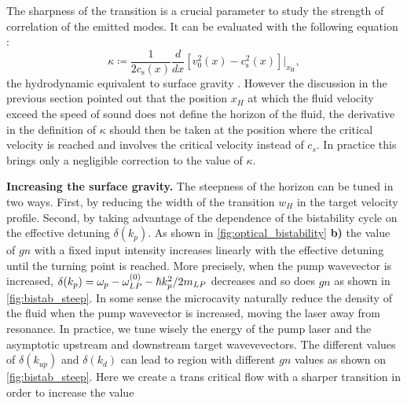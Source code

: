 The sharpness of the transition is a crucial parameter to study the strength of correlation of the emitted modes. It can be evaluated with the following equation :
\begin{equation}
    \kappa \coloneqq \frac{1}{2c_\mathrm{s}(x)}\frac{d}{dx}[v^2_0(x)-c^2_\mathrm{s}(x)]|_{x_\mathrm{H}},
    \label{eq:steepness}
\end{equation}
the hydrodynamic equivalent to surface gravity \cite{barcelo_hawking-like_2006}. However the discussion in the previous section 
pointed out that the position $x_H$ at which the fluid velocity exceed the speed of sound does not define the horizon of the fluid, the derivative
in the definition of $\kappa$ should then be taken at the position where the critical velocity is reached and involves the critical velocity instead of $c_s$.
In practice this brings only a negligible correction to the value of $\kappa$. 

\bigskip

\textbf{Increasing the surface gravity.}
The steepness of the horizon can be tuned in two ways. First, by reducing the width of the transition $w_H$ in the target velocity profile.
Second, by taking advantage of the dependence of the bistability cycle on the effective detuning $\delta(k_p)$.
As shown in \autoref{fig:optical_bistability} \textbf{b)} the value of $gn$ with a fixed input intensity increases linearly with the effective detuning until the turning point is reached. More precisely,
when the pump wavevector is increased,  $\delta(k_p) = \omega_p-\omega_{LP}^{(0)}- \hbar k_p^2/2m_{LP}$ decreases and so does $gn$ as shown in \autoref{fig:bistab_steep}. In some
sense the microcavity naturally reduce the density of the fluid when the pump wavevector is increased, moving the laser away from resonance.
In practice, we tune wisely the energy of the pump laser and the asymptotic upstream and downstream target wavevevectors. The different values of $\delta(k_{up})$ and $\delta(k_{d})$ can
lead to region with different $gn$ values as shown on \autoref{fig:bistab_steep}.
Here we create a trans critical flow with a sharper transition in order to increase the value 

